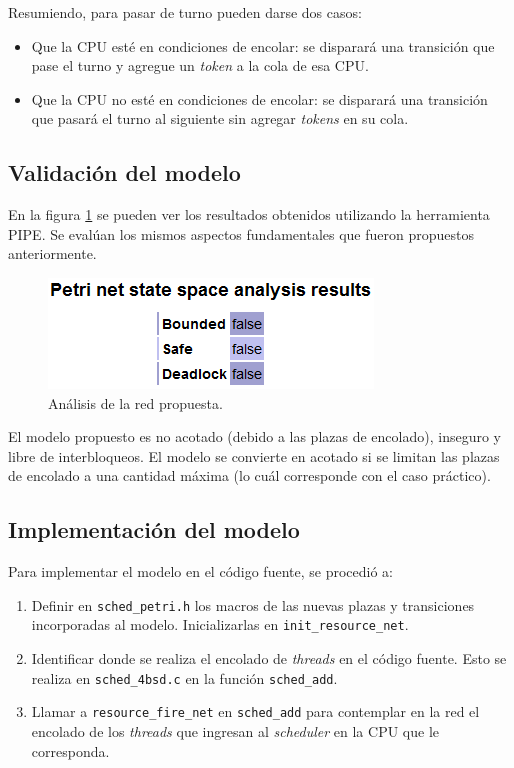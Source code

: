 \documentclass[a4paper]{book}
\begin{document}
Resumiendo, para pasar de turno pueden darse dos casos:
\begin{itemize}
\item Que la CPU est\'e en condiciones de encolar: se disparar\'a una transici\'on que pase el turno y agregue un \emph{token} a la cola de esa CPU.
\item Que la CPU no est\'e en condiciones de encolar: se disparar\'a una transici\'on que pasar\'a el turno al siguiente sin agregar \emph{tokens} en su cola.
\end{itemize}

\subsection{Validaci\'on del modelo}
En la figura \ref{Fig:validacion4} se pueden ver los resultados obtenidos utilizando la herramienta PIPE. Se eval\'uan los mismos aspectos fundamentales que fueron propuestos anteriormente.

\begin{figure} [H]
	\begin{center}
        \includegraphics[scale=0.7]{./imagenes/it4validacion.png}
		\caption{An\'alisis de la red propuesta.}
		\label{Fig:validacion4}
	\end{center}
\end{figure}

El modelo propuesto es no acotado (debido a las plazas de encolado), inseguro y libre de interbloqueos. El modelo se convierte en acotado si se limitan las plazas de encolado a una cantidad máxima (lo cuál corresponde con el caso práctico).

\subsection{Implementaci\'on del modelo}
Para implementar el modelo en el c\'odigo fuente, se procedi\'o a:
\begin{enumerate}
\item Definir en \verb|sched_petri.h| los macros de las nuevas plazas y transiciones incorporadas al modelo.  Inicializarlas en \verb|init_resource_net|.
\item Identificar donde se realiza el encolado de \emph{threads} en el c\'odigo fuente. Esto se realiza en \verb|sched_4bsd.c| en la funci\'on \verb|sched_add|.
\item Llamar a \verb|resource_fire_net| en \verb|sched_add| para contemplar en la red el encolado de los \emph{threads} que ingresan al \emph{scheduler} en la CPU que le corresponda.
\end{enumerate}
\end{document}
